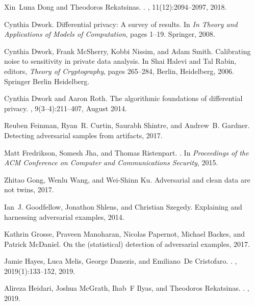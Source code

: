 \documentclass[11pt]{article}
\begin{document}
\begin{thebibliography}{10}
Xin~Luna Dong and Theodoros Rekatsinas.
.
, 11(12):2094--2097,
  2018.

Cynthia Dwork.
\newblock Differential privacy: A survey of results.
\newblock In {\em In Theory and Applications of Models of Computation}, pages
  1--19. Springer, 2008.

Cynthia Dwork, Frank McSherry, Kobbi Nissim, and Adam Smith.
\newblock Calibrating noise to sensitivity in private data analysis.
\newblock In Shai Halevi and Tal Rabin, editors, {\em Theory of Cryptography},
  pages 265--284, Berlin, Heidelberg, 2006. Springer Berlin Heidelberg.

Cynthia Dwork and Aaron Roth.
\newblock The algorithmic foundations of differential privacy.
, 9(3--4):211--407, August
  2014.

Reuben Feinman, Ryan~R. Curtin, Saurabh Shintre, and Andrew~B. Gardner.
\newblock Detecting adversarial samples from artifacts, 2017.

Matt Fredrikson, Somesh Jha, and Thomas Ristenpart.
.
\newblock In {\em Proceedings of the ACM Conference on Computer and
  Communications Security}, 2015.

Zhitao Gong, Wenlu Wang, and Wei-Shinn Ku.
\newblock Adversarial and clean data are not twins, 2017.

Ian~J. Goodfellow, Jonathon Shlens, and Christian Szegedy.
\newblock Explaining and harnessing adversarial examples, 2014.

Kathrin Grosse, Praveen Manoharan, Nicolas Papernot, Michael Backes, and
  Patrick McDaniel.
\newblock On the (statistical) detection of adversarial examples, 2017.

Jamie Hayes, Luca Melis, George Danezis, and Emiliano~De Cristofaro.
.
,
  2019(1):133--152, 2019.

Alireza Heidari, Joshua McGrath, Ihab~F Ilyas, and Theodoros Rekatsinas.
.
, 2019.


\end{thebibliography}
\end{document}
